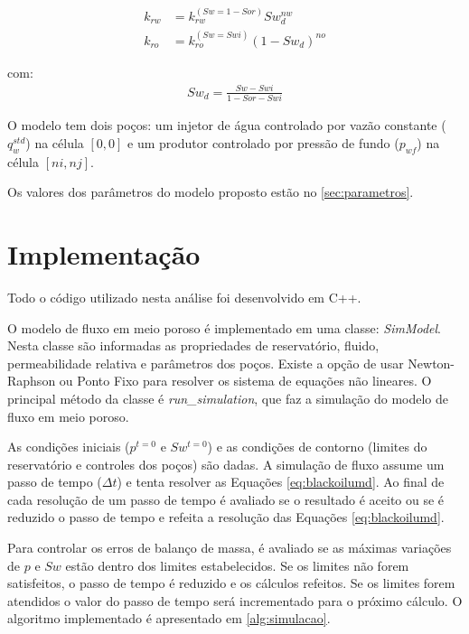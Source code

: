 \documentclass[final,5p]{elsarticle}
\numberwithin{equation}{section}
\begin{document}
        \begin{subequations}
            \begin{align}
                k_{rw} &= k_{rw}^{(Sw=1-Sor)} Sw_d^{nw}  \\
                k_{ro} &= k_{ro}^{(Sw=Swi)} (1-Sw_d)^{no}
            \end{align}
            \label{eq:corey}
        \end{subequations}

        \noindent com:
        \begin{align}
            Sw_d = \frac{Sw - Swi}{1-Sor-Swi} \nonumber
        \end{align}

        O modelo tem dois poços: um injetor de água controlado por vazão constante ($q^{std}_{w}$) na célula $[0,0]$ e um produtor controlado por pressão de fundo ($p_{wf}$) na célula $[ni,nj]$.

        Os valores dos parâmetros do modelo proposto estão no \ref{sec:parametros}.

    \section{Implementação} \label{sec:implementacao}

        Todo o código utilizado nesta análise foi desenvolvido em C++.

        O modelo de fluxo em meio poroso é implementado em uma classe: \emph{SimModel}. Nesta classe são informadas as propriedades de reservatório, fluido, permeabilidade relativa e parâmetros dos poços. Existe a opção de usar Newton-Raphson ou Ponto Fixo para resolver os sistema de equações não lineares. O principal método da classe é \emph{run\_simulation}, que faz a simulação do modelo de fluxo em meio poroso.

        As condições iniciais ($p^{t=0}$ e $Sw^{t=0}$) e as condições de contorno (limites do reservatório e controles dos poços) são dadas. A simulação de fluxo assume um passo de tempo ($\Delta t$) e tenta resolver as Equações \ref{eq:blackoilumd}. Ao final de cada resolução de um passo de tempo é avaliado se o resultado é aceito ou se é reduzido o passo de tempo e refeita a resolução das Equações \ref{eq:blackoilumd}.

        Para controlar os erros de balanço de massa, é avaliado se as máximas variações de $p$ e $Sw$ estão dentro dos limites estabelecidos. Se os limites não forem satisfeitos, o passo de tempo é reduzido e os cálculos refeitos. Se os limites forem atendidos o valor do passo de tempo será incrementado para o próximo cálculo. O algoritmo implementado é apresentado em \ref{alg:simulacao}.
\end{document}
